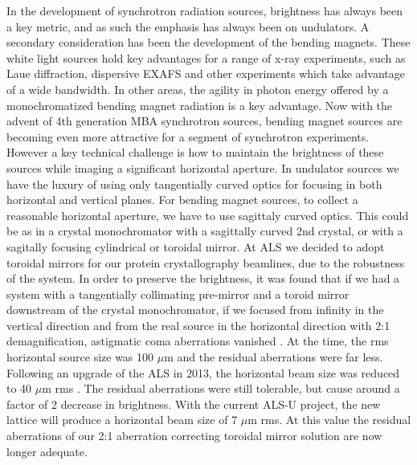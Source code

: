 \documentclass{iucr}              %
\newcommand{\inred}[1]{{\color{red}#1}}
\begin{document}
In the development of synchrotron radiation sources, brightness has always been a key metric, and as such the emphasis has always been on undulators.  A secondary consideration has been the development of the bending magnets. These white light sources hold key advantages for a range of x-ray experiments, such as Laue diffraction, dispersive EXAFS and other experiments which take advantage of a wide bandwidth.  In other areas, the agility in photon energy offered by a monochromatized bending magnet radiation is a key advantage.  Now with the advent of 4th generation MBA synchrotron sources, bending magnet sources are becoming even more attractive for a segment of synchrotron experiments.  However a key technical challenge is how to maintain the brightness of these sources while imaging a significant horizontal aperture.  In undulator sources we have the luxury of using only tangentially curved optics for focusing in both horizontal and vertical planes.  For bending magnet sources, to collect a reasonable horizontal aperture, we have to use sagittaly curved optics.  This could be as in a crystal monochromator with a sagittally curved 2nd crystal, or with a sagitally focusing cylindrical or toroidal mirror.  At ALS we decided to adopt toroidal mirrors for our protein crystallography beamlines, due to the robustness of the system.  In order to preserve the brightness, it was found that if we had a system with a tangentially collimating pre-mirror and a toroid mirror downstream of the crystal monochromator, if we focused from infinity in the vertical direction and from the real source in the horizontal direction with 2:1 demagnification,  astigmatic coma aberrations vanished \inred{\cite{McKinney2000, McKinneySPIE2009, MacDowell2004}}. At the time, the rms horizontal source size was 100 $\mu$m and the residual aberrations were far less.  Following an upgrade of the ALS in 2013, the horizontal beam size was reduced to 40 $\mu$m  rms \cite{Steier_2014}. The residual aberrations were still tolerable, but cause around a factor of 2 decrease in brightness.  With the current ALS-U project, the new lattice will produce a horizontal beam size of 7 $\mu$m rms.  At this value the residual aberrations of our 2:1 aberration correcting toroidal mirror solution are now longer adequate.
\end{document}
